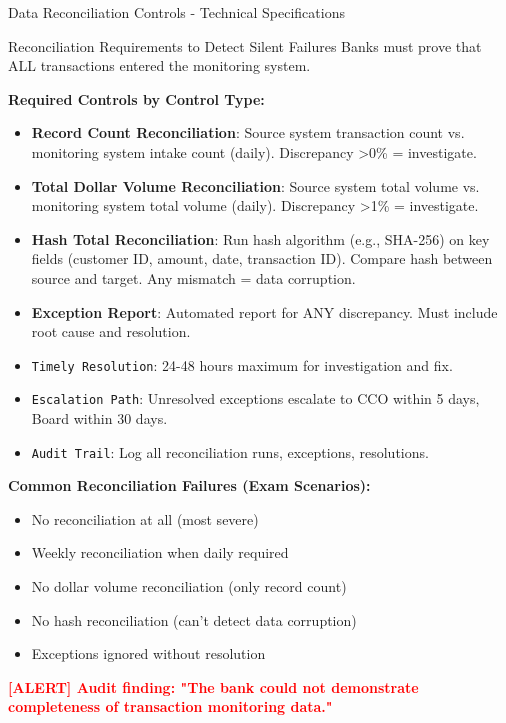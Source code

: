\documentclass[11pt,a4paper]{beamer}
\newcommand{\redflag}[1]{\textcolor{red}{\textbf{[ALERT] #1}}}
\begin{document}
\begin{frame}{Data Reconciliation Controls - Technical Specifications}
	\begin{block}{Reconciliation Requirements to Detect Silent Failures}
		Banks must prove that ALL transactions entered the monitoring system.
	\end{block}
	\textbf{Required Controls by Control Type:}
	\begin{itemize}
		\item \textbf{Record Count Reconciliation}: Source system transaction count vs. monitoring system intake count (daily). Discrepancy >0\% = investigate.
		\item \textbf{Total Dollar Volume Reconciliation}: Source system total volume vs. monitoring system total volume (daily). Discrepancy >1\% = investigate.
		\item \textbf{Hash Total Reconciliation}: Run hash algorithm (e.g., SHA-256) on key fields (customer ID, amount, date, transaction ID). Compare hash between source and target. Any mismatch = data corruption.
		\item \textbf{Exception Report}: Automated report for ANY discrepancy. Must include root cause and resolution.
		\item \texttt{Timely Resolution}: 24-48 hours maximum for investigation and fix.
		\item \texttt{Escalation Path}: Unresolved exceptions escalate to CCO within 5 days, Board within 30 days.
		\item \texttt{Audit Trail}: Log all reconciliation runs, exceptions, resolutions.
	\end{itemize}
	\textbf{Common Reconciliation Failures (Exam Scenarios):}
	\begin{itemize}
		\item No reconciliation at all (most severe)
		\item Weekly reconciliation when daily required
		\item No dollar volume reconciliation (only record count)
		\item No hash reconciliation (can't detect data corruption)
		\item Exceptions ignored without resolution
	\end{itemize}
	\redflag{Audit finding: "The bank could not demonstrate completeness of transaction monitoring data."}
\end{frame}
\end{document}
